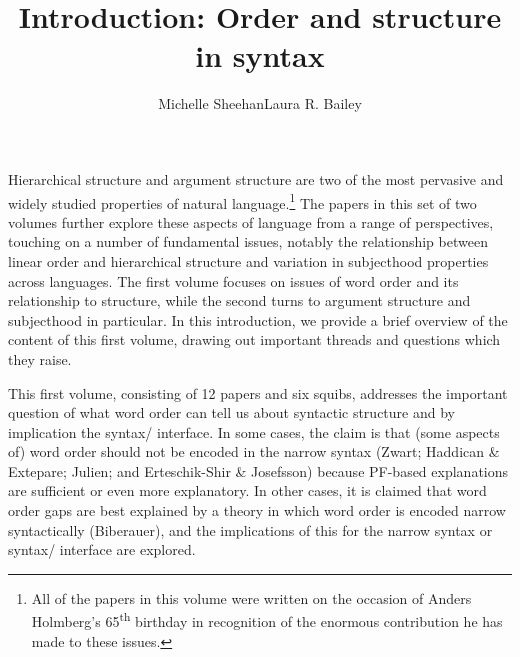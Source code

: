 \documentclass[output=paper]{langsci/langscibook}
\author{Michelle Sheehan\affiliation{Anglia Ruskin University}\lastand Laura R. Bailey\affiliation{University of Kent}}
\title{Introduction: Order and structure in syntax}
\begin{document}
Hierarchical structure and argument structure are two of the most pervasive and widely studied properties of natural language.\footnote{All of the papers in this volume were written on the occasion of Anders Holmberg’s 65\textsuperscript{th} birthday in recognition of the enormous contribution he has made to these issues.} The papers in this set of two volumes further explore these aspects of language from a range of perspectives, touching on a {number} of fundamental issues, notably the relationship between linear order and hierarchical structure and variation in subjecthood properties across languages. The first volume focuses on issues of word order and its relationship to structure, while the second turns to argument structure and subjecthood in particular. In this introduction, we provide a brief overview of the content of this first volume, drawing out important threads and questions which they raise.   

This first volume, consisting of 12 papers and six squibs, addresses the important {question} of what word order can tell us about syntactic structure and by implication the syntax/ interface. In some cases, the claim is that (some aspects of) word order should not be encoded in the narrow syntax (Zwart; Haddican \& Extepare; Julien; and Erteschik-Shir \& Josefsson) because PF-based explanations are sufficient or even more explanatory. In other cases, it is claimed that word order gaps are best explained by a theory in which word order is encoded narrow syntactically (Biberauer), and the implications of this for the narrow syntax or syntax/ interface are explored. 
\end{document}
